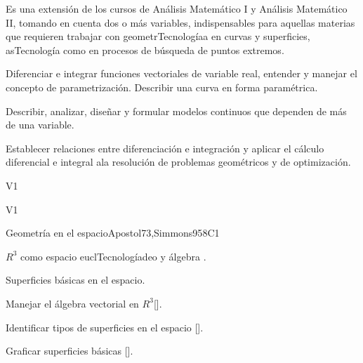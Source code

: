 \begin{syllabus}


\begin{justification}
Es una extensión de los cursos de Análisis Matemático I y Análisis Matemático II, tomando en cuenta dos o más variables, indispensables para aquellas materias que requieren trabajar con geometrTecnologíaa en curvas y superficies, asTecnología como en procesos de búsqueda de puntos extremos.
\end{justification}

\begin{goals}
\item Diferenciar e integrar funciones vectoriales de variable real, entender y manejar el concepto de parametrización. Describir una curva en forma paramétrica.
\item Describir, analizar, diseñar y formular modelos continuos que dependen de más de una variable.
\item Establecer relaciones entre diferenciación e integración y aplicar el cálculo diferencial e integral ala resolución de problemas geométricos y de optimización.
\end{goals}

\begin{outcomes}{V1}
    \item {}
    \item {}
\end{outcomes}

\begin{competences}{V1}
    \item {} 
    \item {} 
    \item {}
\end{competences}

\begin{unit}{}{Geometría en el espacio}{Apostol73,Simmons95}{8}{C1}
   \begin{topics}
      \item $R^3$ como espacio euclTecnologíadeo y álgebra .
      \item Superficies básicas en el espacio.
   \end{topics}
   \begin{learningoutcomes}
      \item Manejar el álgebra vectorial en $R^3$[\Usage].
      \item Identificar tipos de superficies en el espacio [\Usage].
      \item Graficar superficies básicas [\Usage].
      \end{learningoutcomes}
\end{unit}


\end{syllabus}
